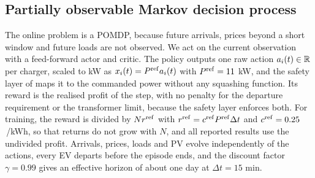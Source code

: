 \subsection{Partially observable Markov decision process}\label{sec:mdp}

The online problem is a POMDP, because future arrivals, prices beyond a short window and future loads are not observed.
We act on the current observation with a feed-forward actor and critic.
The policy outputs one raw action $a_i(t)\in\mathbb R$ per charger, scaled to kW as $x_i(t)=P^{\mathrm{ref}}a_i(t)$ with $P^{\mathrm{ref}}=11$ kW, and the safety layer of  maps it to the commanded power without any squashing function.
Its reward is the realised profit of the step, with no penalty for the departure requirement or the transformer limit, because the safety layer enforces both.
For training, the reward is divided by $N r^{\mathrm{ref}}$ with $r^{\mathrm{ref}}=c^{\mathrm{ref}}P^{\mathrm{ref}}\Delta t$ and $c^{\mathrm{ref}}=0.25$\,\texteuro/kWh, so that returns do not grow with $N$, and all reported results use the undivided profit.
Arrivals, prices, loads and PV evolve independently of the actions, every EV departs before the episode ends, and the discount factor $\gamma=0.99$ gives an effective horizon of about one day at $\Delta t=15$ min.
